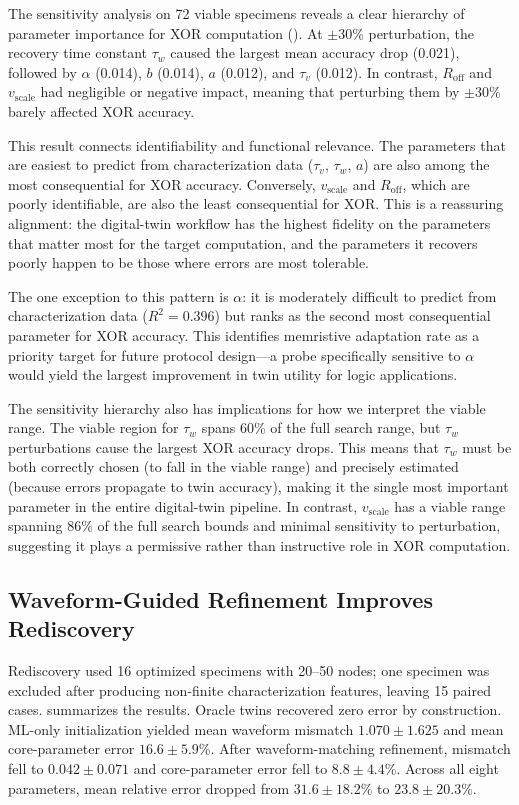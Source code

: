 \documentclass[letterpaper]{article}
\begin{document}
The sensitivity analysis on 72 viable specimens reveals a clear hierarchy of parameter importance for XOR computation (). At $\pm30$\% perturbation, the recovery time constant $\tau_w$ caused the largest mean accuracy drop (0.021), followed by $\alpha$ (0.014), $b$ (0.014), $a$ (0.012), and $\tau_v$ (0.012). In contrast, $R_{\mathrm{off}}$ and $v_{\text{scale}}$ had negligible or negative impact, meaning that perturbing them by $\pm30$\% barely affected XOR accuracy.

This result connects identifiability and functional relevance. The parameters that are easiest to predict from characterization data ($\tau_v$, $\tau_w$, $a$) are also among the most consequential for XOR accuracy. Conversely, $v_{\text{scale}}$ and $R_{\mathrm{off}}$, which are poorly identifiable, are also the least consequential for XOR. This is a reassuring alignment: the digital-twin workflow has the highest fidelity on the parameters that matter most for the target computation, and the parameters it recovers poorly happen to be those where errors are most tolerable.

The one exception to this pattern is $\alpha$: it is moderately difficult to predict from characterization data ($R^2=0.396$) but ranks as the second most consequential parameter for XOR accuracy. This identifies memristive adaptation rate as a priority target for future protocol design---a probe specifically sensitive to $\alpha$ would yield the largest improvement in twin utility for logic applications.

The sensitivity hierarchy also has implications for how we interpret the viable range. The viable region for $\tau_w$ spans 60\% of the full search range, but $\tau_w$ perturbations cause the largest XOR accuracy drops. This means that $\tau_w$ must be both correctly chosen (to fall in the viable range) and precisely estimated (because errors propagate to twin accuracy), making it the single most important parameter in the entire digital-twin pipeline. In contrast, $v_{\text{scale}}$ has a viable range spanning 86\% of the full search bounds and minimal sensitivity to perturbation, suggesting it plays a permissive rather than instructive role in XOR computation.

\subsection{Waveform-Guided Refinement Improves Rediscovery}
Rediscovery used 16 optimized specimens with 20--50 nodes; one specimen was excluded after producing non-finite characterization features, leaving 15 paired cases.  summarizes the results. Oracle twins recovered zero error by construction. ML-only initialization yielded mean waveform mismatch $1.070 \pm 1.625$ and mean core-parameter error $16.6 \pm 5.9$\%. After waveform-matching refinement, mismatch fell to $0.042 \pm 0.071$ and core-parameter error fell to $8.8 \pm 4.4$\%. Across all eight parameters, mean relative error dropped from $31.6 \pm 18.2$\% to $23.8 \pm 20.3$\%.
\end{document}
